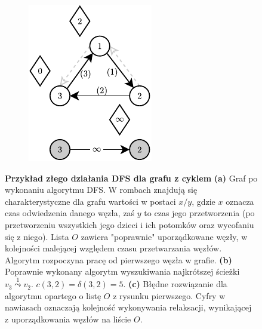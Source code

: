 \begin{figure}[!htbp]
\begin{subfigure}[b]{0.18\textwidth}
		\caption{}
	\end{subfigure}
	\qquad \qquad
	\begin{subfigure}[b]{0.18\textwidth}
		\includegraphics[width=\textwidth]{Chapter_II/BFS-TOPOLOGICAL-SORT-Example/c.pdf}
		\caption{}
	\end{subfigure}
	\caption{\textbf{Przykład złego działania \textsf{DFS} dla grafu z cyklem} \textbf{(a)} Graf po wykonaniu algorytmu \textsf{DFS}. W rombach znajdują się charakterystyczne dla grafu wartości w postaci $x/y$, gdzie $x$ oznacza czas odwiedzenia danego węzła, zaś $y$ to czas jego przetworzenia (po przetworzeniu wszystkich jego dzieci i ich potomków oraz wycofaniu się z niego). Lista $O$ zawiera "poprawnie" uporządkowane węzły, w kolejności malejącej względem czasu przetwarzania węzłów. Algorytm rozpoczyna pracę od pierwszego węzła w grafie. \textbf{(b)} Poprawnie wykonany algorytm wyszukiwania najkrótszej ścieżki $v_{3} \overset{1} \leadsto v_{2}$. $c \left( 3, 2 \right) = \delta \left( 3, 2 \right) = 5$. \textbf{(c)} Błędne rozwiązanie dla algorytmu opartego o listę $O$ z rysunku pierwszego. Cyfry w nawiasach oznaczają kolejność wykonywania relaksacji, wynikającej z uporządkowania węzłów na liście $O$.} \label{fig:exampleDFS}
\end{figure}

